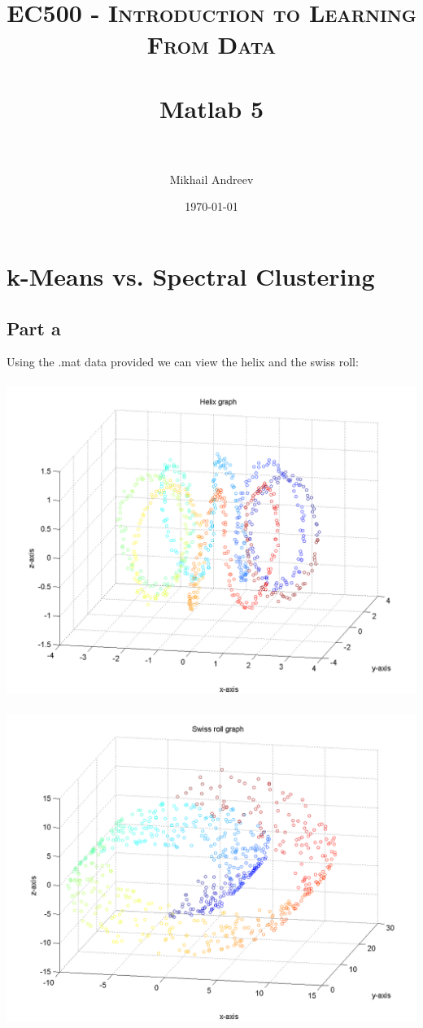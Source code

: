 \documentclass[paper=a4, fontsize=11pt]{scrartcl} %
\title{	
	\normalfont \normalsize 
	\textsc{EC500 - Introduction to Learning From Data} \\ [25pt] %
	\horrule{0.5pt} \\[0.4cm] %
	\huge Matlab 5 \\ %
	\horrule{2pt} \\[0.5cm] %
}
\author{Mikhail Andreev} %
\date{\normalsize\today} %
\numberwithin{equation}{section} %
\numberwithin{figure}{section} %
\numberwithin{table}{section} %
\begin{document}
	
	\maketitle %
	

	
	\newpage
	\section{k-Means vs. Spectral Clustering}
	\subsection{Part a}
	Using the .mat data provided we can view the helix and the swiss roll:
	\\\\
	\hspace*{-3cm}\includegraphics[]{helix}
	\\\\
	\hspace*{-3cm}\includegraphics[]{swiss_roll}
\end{document}
